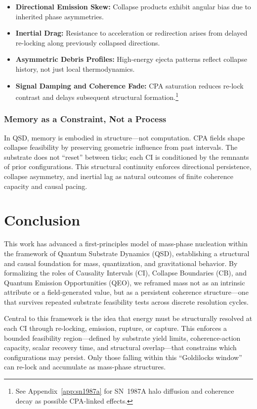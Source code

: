 \documentclass[preprints,article,submit,pdftex,moreauthors]{Definitions/mdpi}
\begin{document}
\begin{itemize}
    \item \textbf{Directional Emission Skew:} Collapse products exhibit angular bias due to inherited phase asymmetries.
    \item \textbf{Inertial Drag:} Resistance to acceleration or redirection arises from delayed re-locking along previously collapsed directions.
    \item \textbf{Asymmetric Debris Profiles:} High-energy ejecta patterns reflect collapse history, not just local thermodynamics.
    \item \textbf{Signal Damping and Coherence Fade:} CPA saturation reduces re-lock contrast and delays subsequent structural formation.\footnote{See Appendix~\ref{app:sn1987a} for SN~1987A halo diffusion and coherence decay as possible CPA-linked effects.}
\end{itemize}

\subsubsection*{Memory as a Constraint, Not a Process}

In QSD, memory is embodied in structure—not computation. CPA fields shape collapse feasibility by preserving geometric influence from past intervals. The substrate does not “reset” between ticks; each CI is conditioned by the remnants of prior configurations. This structural continuity enforces directional persistence, collapse asymmetry, and inertial lag as natural outcomes of finite coherence capacity and causal pacing.


\section{Conclusion}

This work has advanced a first-principles model of mass-phase nucleation within the framework of Quantum Substrate Dynamics (QSD), establishing a structural and causal foundation for mass, quantization, and gravitational behavior. By formalizing the roles of Causality Intervals (CI), Collapse Boundaries (CB), and Quantum Emission Opportunities (QEO), we reframed mass not as an intrinsic attribute or a field-generated value, but as a persistent coherence structure—one that survives repeated substrate feasibility tests across discrete resolution cycles.

Central to this framework is the idea that energy must be structurally resolved at each CI through re-locking, emission, rupture, or capture. This enforces a bounded feasibility region—defined by substrate yield limits, coherence-action capacity, scalar recovery time, and structural overlap—that constrains which configurations may persist. Only those falling within this “Goldilocks window” can re-lock and accumulate as mass-phase structures.
\end{document}

